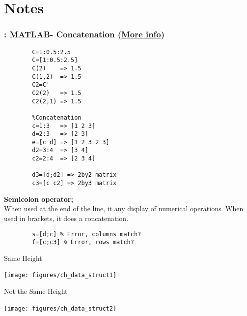 \documentclass[11pt]{beamer}
\begin{document}
\section{Notes}
\begin{frame}[fragile]
	
	\frametitle{\secname: MATLAB- Concatenation (\href{http://www.mathworks.com/help/matlab/math/creating-and-concatenating-matrices.html}{More info})}
	\centering
	\begin{minipage}[t]{0.45\linewidth}
		\vspace{-15pt}	
		\begin{verbatim}
		C=1:0.5:2.5
		C=[1:0.5:2.5]
		C(2)    => 1.5
		C(1,2)  => 1.5
		C2=C'
		C2(2)   => 1.5
		C2(2,1) => 1.5	
		
		%Concatenation
		c=1:3   => [1 2 3]
		d=2:3   => [2 3]
		e=[c d] => [1 2 3 2 3]
		d2=3:4  => [3 4]
		c2=2:4  => [2 3 4]
		
		d3=[d;d2] => 2by2 matrix
		c3=[c c2] => 2by3 matrix		
		\end{verbatim}
	\end{minipage}
	\begin{minipage}[t]{0.5\linewidth}
		\vspace{-15pt}
		\textbf{Semicolon operator;}\\
		When used at the end of the line, it  any display of numerical operations.
		When used in brackets, it does a  concatenation.
		\vspace{-7pt} 
		\begin{verbatim}
		s=[d;c] % Error, columns match?
		f=[c;c3] % Error, rows match?
		\end{verbatim}
		Same Height
		\vspace{-7pt}
		\begin{center}
			\texttt{[image: figures/ch\_data\_struct1]}\
		\end{center}
		\vspace{-7pt}	
		Not the Same Height
		\vspace{-7pt}	
		\begin{center}
			\texttt{[image: figures/ch\_data\_struct2]}\
		\end{center}
		
	\end{minipage}
	
\end{frame}
\end{document}
